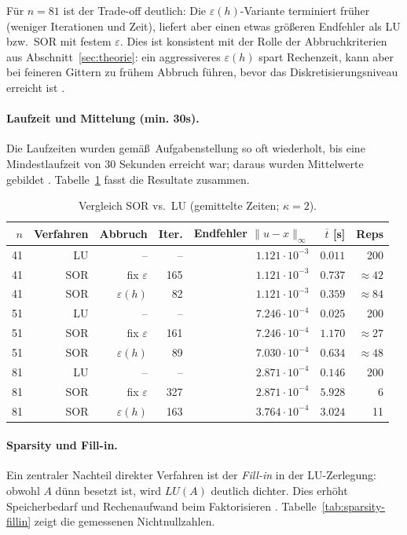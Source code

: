 \documentclass[11pt,a4paper]{article}
\begin{document}
F\"ur $n=81$ ist der Trade-off deutlich: Die $\varepsilon(h)$-Variante terminiert fr\"uher (weniger Iterationen und Zeit),
liefert aber einen etwas gr\"o\ss eren Endfehler als LU bzw.\ SOR mit festem $\varepsilon$. Dies ist konsistent mit der
Rolle der Abbruchkriterien aus Abschnitt~\ref{sec:theorie}: ein aggressiveres $\varepsilon(h)$ spart Rechenzeit, kann aber
bei feineren Gittern zu fr\"uhem Abbruch f\"uhren, bevor das Diskretisierungsniveau erreicht ist \cite{Rabus2025Serie3}.

\paragraph{Laufzeit und Mittelung (min. 30s).}
Die Laufzeiten wurden gem\"a\ss\ Aufgabenstellung so oft wiederholt, bis eine Mindestlaufzeit von 30 Sekunden
erreicht war; daraus wurden Mittelwerte gebildet \cite{Rabus2025Serie3}. Tabelle~\ref{tab:compare-lu} fasst die Resultate zusammen.

\begin{table}[H]
\centering
\caption{Vergleich SOR vs.\ LU (gemittelte Zeiten; $\kappa=2$).}
\label{tab:compare-lu}
\begin{tabular}{rrrrrrr}
\hline
$n$ & Verfahren & Abbruch & Iter. & Endfehler $\|u-x\|_\infty$ & $\overline{t}$ [s] & Reps \\
\hline
41 & LU  & -- & --  & $1.121\cdot 10^{-3}$ & $0.011$ & 200 \\
41 & SOR & fix $\varepsilon$ & 165 & $1.121\cdot 10^{-3}$ & $0.737$ & $\approx 42$ \\
41 & SOR & $\varepsilon(h)$  & 82  & $1.121\cdot 10^{-3}$ & $0.359$ & $\approx 84$ \\
\hline
51 & LU  & -- & --  & $7.246\cdot 10^{-4}$ & $0.025$ & 200 \\
51 & SOR & fix $\varepsilon$ & 161 & $7.246\cdot 10^{-4}$ & $1.170$ & $\approx 27$ \\
51 & SOR & $\varepsilon(h)$  & 89  & $7.030\cdot 10^{-4}$ & $0.634$ & $\approx 48$ \\
\hline
81 & LU  & -- & --  & $2.871\cdot 10^{-4}$ & $0.146$ & 200 \\
81 & SOR & fix $\varepsilon$ & 327 & $2.871\cdot 10^{-4}$ & $5.928$ & 6 \\
81 & SOR & $\varepsilon(h)$  & 163 & $3.764\cdot 10^{-4}$ & $3.024$ & 11 \\
\hline
\end{tabular}
\end{table}

\paragraph{Sparsity und Fill-in.}
Ein zentraler Nachteil direkter Verfahren ist der \emph{Fill-in} in der LU-Zerlegung: obwohl $A$ d\"unn besetzt ist,
wird $LU(A)$ deutlich dichter. Dies erh\"oht Speicherbedarf und Rechenaufwand beim Faktorisieren
\cite{Rabus2025Serie2,Projektbericht2025}. Tabelle~\ref{tab:sparsity-fillin} zeigt die gemessenen Nichtnullzahlen.
\end{document}

